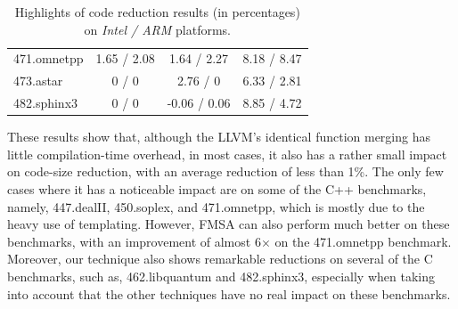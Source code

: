 \begin{table}[]
{\begin{tabular}{lccc}
471.omnetpp                               & 1.65 / 2.08        & 1.64 / 2.27   & 8.18 / 8.47             \\
\rowcolor{evencolor} 473.astar                                 & 0 / 0              & 2.76 / 0      & 6.33 / 2.81             \\
482.sphinx3                               & 0 / 0              & -0.06 / 0.06  & 8.85 / 4.72             \\
\bottomrule
\end{tabular}
}
\caption{Highlights of code reduction results (in percentages) on \textit{Intel / ARM} platforms. }
\end{table}


These results show that, although the LLVM's identical function merging has
little compilation-time overhead, in most cases, it also has a rather small
impact on code-size reduction, with an average reduction of less than 1\%.
The only few cases where it has a noticeable impact are on some of the C++
benchmarks, namely, 447.dealII, 450.soplex, and 471.omnetpp, which is mostly
due to the heavy use of templating. %
However, FMSA can also perform much better on these
benchmarks, with an improvement of almost 6$\times$ on the 471.omnetpp benchmark.
Moreover, our technique also shows remarkable reductions on several of the
C benchmarks, such as, 462.libquantum and 482.sphinx3, especially when taking into
account that the other techniques have no real impact on these benchmarks.


